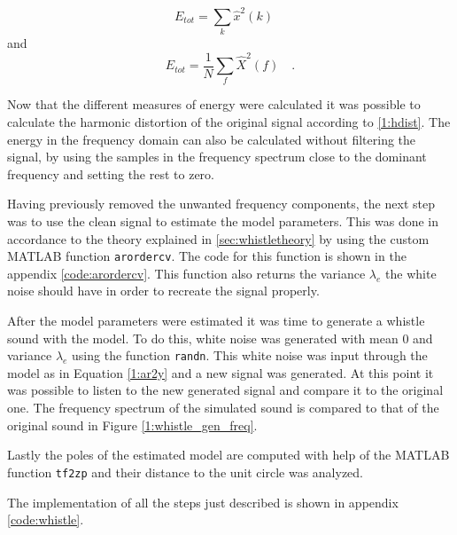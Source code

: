 \documentclass{IEEEtran}
\newcommand{\code}[1]{\texttt{#1}}
\begin{document}
\begin{equation}
E_{tot} = \sum_k{\hat{x}^2(k)} \quad
\end{equation}
and
\begin{equation}
E_{tot} = \frac{1}{N}\sum_f{\hat{X}^2(f)} \quad .
\end{equation}

Now that the different measures of energy were calculated it was possible to
calculate the harmonic distortion of the original signal according to
\ref{1:hdist}. The energy in the frequency domain can also be calculated
without filtering the signal, by using the samples in the frequency spectrum
close to the dominant frequency and setting the rest to zero.

Having previously removed the unwanted frequency components, the next
step was to use the clean signal to estimate the model parameters.
This was done in accordance to the theory explained in \ref{sec:whistletheory}
by using the custom MATLAB function \code{arordercv}. The code for this
function is shown in the appendix \ref{code:arordercv}. This function also
returns the variance $\lambda_e$ the white noise should have in order to
recreate the signal properly.

After the model parameters were estimated it was time to generate a whistle
sound with the model. To do this, white noise was generated with mean $0$
and variance $\lambda_e$ using the function \code{randn}. This white noise
was input through the model as in Equation \ref{1:ar2y} and a new signal
was generated. At this point it was possible to listen to the new generated
signal and compare it to the original one. The frequency spectrum of the
simulated sound is compared to that of the original sound in Figure
\ref{1:whistle_gen_freq}.

Lastly the poles of the estimated model are computed with help of the
MATLAB function \code{tf2zp} and their distance to the unit circle was
analyzed.

The implementation of all the steps just described is shown in appendix
\ref{code:whistle}.
\end{document}
